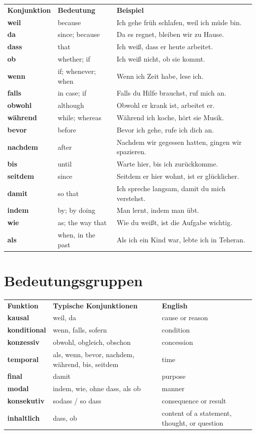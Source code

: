\documentclass[a4paper,11pt]{article}
\begin{document}
\begin{longtable}{>{\bfseries}p{3.0cm}|p{3.7cm}|p{7.3cm}}
\rowcolor{HeaderBlueDark}
\color{white}\textbf{Konjunktion} &
\color{white}\textbf{Bedeutung} &
\color{white}\textbf{Beispiel} \\
weil & because & Ich gehe früh schlafen, weil ich müde bin. \\
da & since; because & Da es regnet, bleiben wir zu Hause. \\
dass & that & Ich weiß, dass er heute arbeitet. \\
ob & whether; if & Ich weiß nicht, ob sie kommt. \\
wenn & if; whenever; when & Wenn ich Zeit habe, lese ich. \\
falls & in case; if & Falls du Hilfe brauchst, ruf mich an. \\
obwohl & although & Obwohl er krank ist, arbeitet er. \\
während & while; whereas & Während ich koche, hört sie Musik. \\
bevor & before & Bevor ich gehe, rufe ich dich an. \\
nachdem & after & Nachdem wir gegessen hatten, gingen wir spazieren. \\
bis & until & Warte hier, bis ich zurückkomme. \\
seitdem & since & Seitdem er hier wohnt, ist er glücklicher. \\
damit & so that & Ich spreche langsam, damit du mich verstehst. \\
indem & by; by doing & Man lernt, indem man übt. \\
wie & as; the way that & Wie du weißt, ist die Aufgabe wichtig. \\
als & when, in the past & Als ich ein Kind war, lebte ich in Teheran. \\
\end{longtable}

\section{Bedeutungsgruppen}

\begin{longtable}{>{\bfseries}p{3.8cm}|p{4.3cm}|p{5.9cm}}
\rowcolor{HeaderBlueDark}
\color{white}\textbf{Funktion} &
\color{white}\textbf{Typische Konjunktionen} &
\color{white}\textbf{English} \\
kausal & weil, da & cause or reason \\
konditional & wenn, falls, sofern & condition \\
konzessiv & obwohl, obgleich, obschon & concession \\
temporal & als, wenn, bevor, nachdem, während, bis, seitdem & time \\
final & damit & purpose \\
modal & indem, wie, ohne dass, als ob & manner \\
konsekutiv & sodass / so dass & consequence or result \\
inhaltlich & dass, ob & content of a statement, thought, or question \\
\end{longtable}
\end{document}
